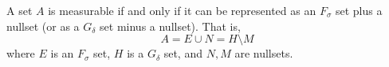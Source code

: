 \begin{theorem}[Theorem 3.15]
A set $A$ is measurable if and only if it can be represented as an $F_{\sigma}$ set plus a nullset (or as a $G_{\delta}$ set minus a nullset). That is,
$$
A = E \cup N = H \setminus M
$$
where $E$ is an $F_{\sigma}$ set, $H$ is a $G_{\delta}$ set, and $N, M$ are nullsets.
\end{theorem}
